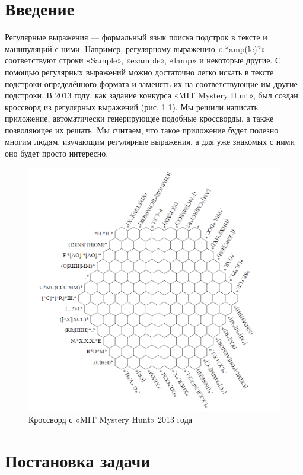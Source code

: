 \documentclass[12pt]{report}
\begin{document}
    
    \newpage %
\renewcommand*\contentsname{Кроссворды из регулярных выражений }
\tableofcontents
    \newpage %
\chapter{Введение}
Регулярные выражения — формальный язык поиска подстрок в тексте и манипуляций с ними. Например, регулярному выражению «.*amp(le)?» соответствуют строки «Sample», «example», «lamp» и некоторые другие. С помощью регулярных выражений можно достаточно легко искать в тексте подстроки определённого формата и заменять их на соответствующие им другие подстроки. В 2013 году, как задание конкурса «MIT Mystery Hunt», был создан кроссворд из регулярных выражений (рис. \ref{pic:MITHex}). Мы решили написать приложение, автоматически генерирующее подобные кроссворды, а также позволяющее их решать. Мы считаем, что такое приложение будет полезно многим людям, изучающим регулярные выражения, а для уже знакомых с ними оно будет просто интересно.
 \begin{figure}[ht!]
 \centering
    \includegraphics[width=.7\textwidth]{MITHexagon.png}
    \caption{\label{pic:MITHex}Кроссворд с «MIT Mystery Hunt» 2013 года}
\end{figure}

    \newpage %
   \chapter{Постановка задачи}
   
\end{document}
